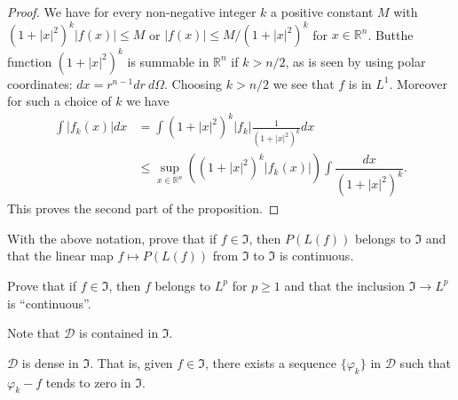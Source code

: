\begin{proof}
We have for every non-negative integer $k$ a positive constant $M$
with $(1+|x|^{2})^{k}|f(x)|\leq M$ or $|f(x)|\leq M/(1+|x|^{2})^{k}$
for $x\in \mathbb{R}^{n}$. But\pageoriginale the function
$(1+|x|^{2})^{k}$ is summable in $\mathbb{R}^{n}$ if $k>n/2$, as is
seen by using polar coordinates: $dx=r^{n-1}dr \ d\Omega$. Choosing
$k>n/2$ we see that $f$ is in $L^{1}$. Moreover for such a choice of
$k$ we have
\begin{align*}
\int |f_{k}(x)|dx &= \int
(1+|x|^{2})^{k}|f_{k}|\frac{1}{(1+|x|^{2})^{k}}dx\\[3pt]
&\leq \sup\limits_{x\in \mathbb{R}^{n}}\left((1+|x|^{2})^{k}|f_{k}(x)|\right)\int\dfrac{dx}{(1+|x|^{2})^{k}}.
\end{align*}
This proves the second part of the proposition.
\end{proof}

\begin{exer*}
With the above notation, prove that if $f\in \mathfrak{I}$, then
$P(L(f))$ belongs to $\mathfrak{I}$ and that the linear map $f\mapsto
P(L(f))$ from $\mathfrak{I}$ to $\mathfrak{I}$ is continuous.
\end{exer*}

\begin{exer*}
Prove that if $f\in \mathfrak{I}$, then $f$ belongs to $L^{p}$ for
$p\geq 1$ and that the inclusion $\mathfrak{I}\to L^{p}$ is ``continuous''.
\end{exer*}

Note that $\mathcal{D}$ is contained in $\mathfrak{I}$.

\begin{proposition}\label{chap4-prop3}
$\mathcal{D}$ is dense in $\mathfrak{I}$. That is, given $f\in
  \mathfrak{I}$, there exists a sequence $\{\varphi_{k}\}$ in
  $\mathcal{D}$ such that $\varphi_{k}-f$ tends to zero in $\mathfrak{I}$.
\end{proposition}

